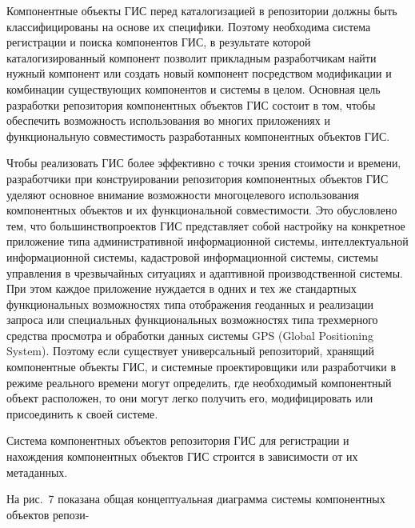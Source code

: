 \begin{multicols}{2}
      Компонентные объекты ГИС перед каталогизацией в репозитории должны быть 
классифицированы на основе их специфики. Поэтому необходима система регистрации и 
поиска компонентов ГИС, в результате которой каталогизированный компонент позволит 
прикладным разработчикам найти нужный компонент или создать новый компонент 
посредством модификации и комбинации существующих компонентов и системы в целом. 
Основная цель разработки репозитория компонентных объектов ГИС состоит в том, чтобы 
обеспечить возможность использования во многих приложениях и функциональную 
совместимость разработанных компонентных объектов ГИС.
      
      Чтобы реализовать ГИС более эффективно с точки зрения стоимости и времени, 
разработчики при конструировании репозитория компонентных объектов ГИС уделяют 
основное внимание возможности многоцелевого использования компонентных объектов и 
их функциональной совмести\-мости. Это обусловлено тем, что \mbox{большинство}\linebreak проектов 
ГИС представляет собой настройку на конкретное приложение типа административной 
информационной сис\-те\-мы, интеллектуальной информационной сис\-те\-мы, кадастровой 
информационной сис\-те\-мы, сис\-те\-мы управ\-ле\-ния в чрезвычайных ситуациях и адаптивной 
производственной сис\-те\-мы. При этом каждое приложение нуждается в одних и тех же 
стандартных функциональных возможностях типа отображения геоданных и реализации 
запроса или специальных функциональных возможностях типа трехмерного средства 
просмотра и обработки данных сис\-те\-мы GPS (Global Positioning System). 
Поэтому если существует универсальный 
репозиторий, хранящий компонентные объекты ГИС, и сис\-тем\-ные проектировщики или 
разработчики в режиме реального времени могут определить, где необходимый 
компонентный объект расположен, то они могут легко получить его, модифицировать или 
присоединить к своей сис\-теме. 
      
      Система компонентных объектов репозитория ГИС для регистрации и нахождения 
компонентных объектов ГИС строится в зависимости от их метаданных.


      На рис.~7 показана общая концептуальная диаграмма системы компонентных 
объектов репози-\linebreak\vspace*{-12pt}

\pagebreak

\end{multicols}

\begin{figure} %
 \vspace*{1pt}
 \begin{center}
 \mbox{%
 \epsfxsize=133.07mm
 }
 \end{center}
 \vspace*{-9pt}
\vspace*{6pt}
\end{figure}

